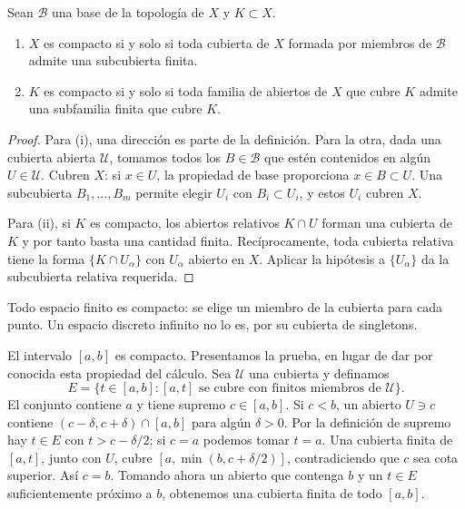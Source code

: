 \begin{proposicion}\label{ch13:criterios}
Sean $\mathcal B$ una base de la topología de $X$ y $K\subset X$.
\begin{enumerate}[label=(\roman*)]
\item $X$ es compacto si y solo si toda cubierta de $X$ formada por miembros de $\mathcal B$ admite una subcubierta finita.
\item $K$ es compacto si y solo si toda familia de abiertos de $X$ que cubre $K$ admite una subfamilia finita que cubre $K$.
\end{enumerate}
\end{proposicion}
\begin{proof}
Para (i), una dirección es parte de la definición. Para la otra, dada una cubierta abierta $\mathcal U$, tomamos todos los $B\in\mathcal B$ que estén contenidos en algún $U\in\mathcal U$. Cubren $X$: si $x\in U$, la propiedad de base proporciona $x\in B\subset U$. Una subcubierta $B_1,\ldots,B_m$ permite elegir $U_i$ con $B_i\subset U_i$, y estos $U_i$ cubren $X$.

Para (ii), si $K$ es compacto, los abiertos relativos $K\cap U$ forman una cubierta de $K$ y por tanto basta una cantidad finita. Recíprocamente, toda cubierta relativa tiene la forma $\{K\cap U_\alpha\}$ con $U_\alpha$ abierto en $X$. Aplicar la hipótesis a $\{U_\alpha\}$ da la subcubierta relativa requerida.
\end{proof}

\begin{ejemplo}
Todo espacio finito es compacto: se elige un miembro de la cubierta para cada punto. Un espacio discreto infinito no lo es, por su cubierta de singletons.

El intervalo $[a,b]$ es compacto. Presentamos la prueba, en lugar de dar por conocida esta propiedad del cálculo. Sea $\mathcal U$ una cubierta y definamos
\[
E=\{t\in[a,b]:[a,t]\text{ se cubre con finitos miembros de }\mathcal U\}.
\]
El conjunto contiene $a$ y tiene supremo $c\in[a,b]$. Si $c<b$, un abierto $U\ni c$ contiene $(c-\delta,c+\delta)\cap[a,b]$ para algún $\delta>0$. Por la definición de supremo hay $t\in E$ con $t>c-\delta/2$; si $c=a$ podemos tomar $t=a$. Una cubierta finita de $[a,t]$, junto con $U$, cubre $[a,\min(b,c+\delta/2)]$, contradiciendo que $c$ sea cota superior. Así $c=b$. Tomando ahora un abierto que contenga $b$ y un $t\in E$ suficientemente próximo a $b$, obtenemos una cubierta finita de todo $[a,b]$.
\end{ejemplo}

